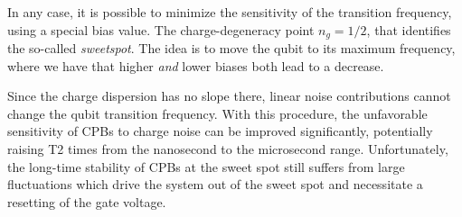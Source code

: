 In any case, it is possible to minimize the sensitivity of the transition frequency, using a special bias value. The charge-degeneracy point $n_g = 1/2$, that identifies the so-called \textit{sweetspot}.
The idea is to move the qubit to its maximum frequency, where we have that higher \textit{and} lower biases both lead to a decrease.

Since the charge dispersion has no slope there, linear noise contributions cannot change the qubit transition frequency.
With this procedure, the unfavorable sensitivity of CPBs to charge noise can be improved significantly, potentially raising T2 times from the nanosecond to the microsecond range.
Unfortunately, the long-time stability of CPBs at the sweet spot still suffers from large fluctuations which drive the system out of the sweet spot and necessitate a resetting of the gate voltage.


